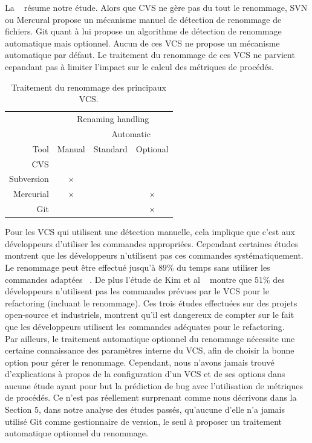 La ~ résume notre étude. Alors que CVS ne gère pas du tout le renommage, SVN ou Mercural propose un mécanisme manuel de détection de renommage de fichiers. Git quant à lui propose un algorithme de détection de renommage automatique mais optionnel. Aucun de ces VCS ne propose un mécanisme automatique par défaut. Le traitement du renommage de ces VCS ne parvient cepandant pas à limiter l'impact sur le calcul des métriques de procédés.\\ 

\begin{table}[h]
\centering
\begin{tabular}{rccc}
\toprule
 & \multicolumn{3}{c}{Renaming handling}\\
\cmidrule{2-4}
& & \multicolumn{2}{c}{Automatic}\\
\cmidrule{3-4}
Tool & Manual & Standard & Optional\\
\midrule
CVS & & &\\
Subversion & $\times$ & &\\
Mercurial & $\times$ & & $\times$\\
Git & & & $\times$\\
\bottomrule
\end{tabular}
\caption{Traitement du renommage des principaux VCS.}
\label{tab:vcs}
\end{table}

Pour les VCS qui utilisent une détection manuelle, cela implique que c'est aux développeurs d'utiliser les commandes appropriées. Cependant certaines études montrent que les développeurs n'utilisent pas ces commandes systématiquement. Le renommage peut être effectué jusqu'à $89\%$ du temps sans utiliser les commandes adaptées ~\cite{lavoie_inferring_2012,steidl_incremental_2014}. De plus l'étude de Kim et al ~\cite{kim_field_2012} montre que $51$\% des développeurs n'utilisent pas les commandes prévues par le VCS pour le refactoring (incluant le renommage). Ces trois études effectuées sur des projets open-source et industriels, montrent qu'il est dangereux de compter sur le fait que les développeurs utilisent les commandes adéquates pour le refactoring.\\

Par ailleurs, le traitement automatique optionnel du renommage nécessite une certaine connaissance des paramètres interne du VCS, afin de choisir la bonne option pour gérer le renommage. Cependant, nous n'avons jamais trouvé d'explications à propos de la configuration d'un VCS et de ses options dans aucune étude ayant pour but la prédiction de bug avec l'utilisation de métriques de procédés. Ce n'est pas réellement surprenant comme nous décrivons dans la Section 5, dans notre analyse des études passés, qu'aucune d'elle n'a jamais utilisé Git comme gestionnaire de version, le seul à proposer un traitement automatique optionnel du renommage.\\

